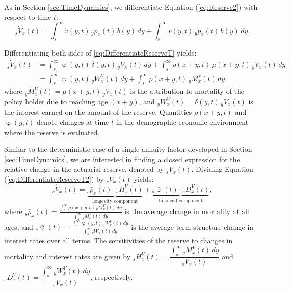 \documentclass[12pt]{article}
\begin{document}
As in Section \ref{sec:TimeDynamics}, we differentiate Equation (\ref{eq:Reserve2}) with respect to time $t$:
\begin{equation}\label{eq:DifferentiateReserveT}
	{}_s\dot{V}_x(t) = \int_s^\infty \dot{v}(y,t) \, {}_yp_x(t) \, b(y) \, dy + \int_s^\infty v(y,t) \, {}_y\dot{p}_x(t) \, b(y) \, dy.
\end{equation}

Differentiating both sides of \ref{eq:DifferentiateReserveT} yields:
\begin{equation}\label{eq:DifferentiateReserveT2}
	\begin{split}
		{}_s\dot{V}_x(t) &= \int_s^\infty \upvarphi(y,t) \, \delta(y,t) \, {}_yV_x(t) \, dy + \int_s^\infty \rho(x+y,t) \, \mu(x+y,t) \, {}_yV_x(t) \, dy \\ 
		&= \int_s^\infty \upvarphi(y,t) \, {}_yW^V_x(t) \, dy + \int_s^\infty \rho(x+y,t) \, {}_yM^V_x(t) \, dy,
	\end{split}
\end{equation}
where ${}_yM^V_x(t) = \mu(x+y,t) \, {}_yV_x(t)$ is the attribution to mortality of the policy holder due to reaching age $(x+y)$, and ${}_yW^V_x(t) = \delta(y,t) \, {}_yV_x(t)$ is the interest earned on the amount of the reserve. Quantities $\rho(x+y,t)$ and $\upvarphi(y,t)$ denote changes at time $t$ in the demographic-economic environment where the reserve is evaluated. 


Similar to the deterministic case of a single annuity factor developed in Section \ref{sec:TimeDynamics}, we are interested in finding a closed expression for the relative change in the actuarial reserve, denoted by ${}_s\acute{V}_x(t)$. Dividing Equation (\ref{eq:DifferentiateReserveT2}) by ${}_sV_x(t)$ yields:
\begin{equation}\label{eq:AccuteDifferential}
	{}_s\acute{V}_x(t) = \underbrace{{}_s\bar{\rho}_x(t) \cdot {}_sH_x^V(t)}_\text{longevity component} + \underbrace{{}_s\bar{\upvarphi}(t) \cdot {}_sD_x^V(t)}_\text{financial component},
\end{equation}
where ${}_s\bar{\rho}_x(t) = \frac{\int_s^\infty \rho(x+y,t) \, {}_yM^V_x(t) \, dy}{\int_s^\infty {}_yM^V_x(t) \, dy}$ is the average change in mortality at all ages, and ${}_s\bar{\upvarphi}(t) = \frac{\int_s^\infty \upvarphi(y,t) \, {}_yW^V_x(t) \, dy}{\int_s^\infty {}_yW_x(t) \, dy}$ is the average term-structure change in interest rates over all terms. The sensitivities of the reserve to changes in mortality and interest rates are given by ${}_sH_x^V(t) = \dfrac{\int_{s}^{\infty} {}_yM^V_x(t) \, dy}{{}_sV_x(t)}$ and ${}_sD_x^V(t) = \dfrac{\int_{s}^{\infty} {}_yW^V_x(t) \, dy}{{}_sV_x(t)}$, respectively.
\end{document}
